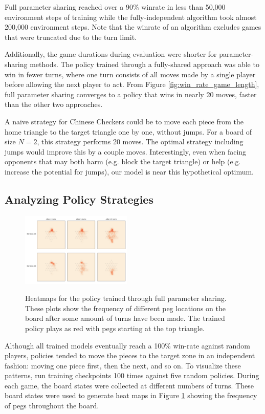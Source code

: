 \documentclass[12pt, a4paper, twocolumn]{article}
\begin{document}
Full parameter sharing reached over a 90\% winrate in less than 50,000 environment steps of training while the fully-independent algorithm took almost 200,000 environment steps. Note that the winrate of an algorithm excludes games that were truncated due to the turn limit.

Additionally, the game durations during evaluation were shorter for parameter-sharing methods. The policy trained through a fully-shared approach was able to win in fewer turns, where one turn consists of all moves made by a single player before allowing the next player to act. From Figure \ref{fig:win_rate_game_length}, full parameter sharing converges to a policy that wins in nearly 20 moves, faster than the other two approaches.

A naive strategy for Chinese Checkers could be to move each piece from the home triangle to the target triangle one by one, without jumps. For a board of size $N = 2$, this strategy performs 20 moves. The optimal strategy including jumps would improve this by a couple moves. Interestingly, even when facing opponents that may both harm (e.g. block the target triangle) or help (e.g. increase the potential for jumps), our model is near this hypothetical optimum.

\subsection{Analyzing Policy Strategies}
\begin{figure}[h]
  \centering
    \includegraphics[width=0.47\textwidth]{images/random_heatmap.png}
  \label{fig:heatmap}
  \caption{Heatmaps for the policy trained through full parameter sharing. These plots show the frequency of different peg locations on the board after some amount of turns have been made. The trained policy plays as red with pegs starting at the top triangle.}
\end{figure}

Although all trained models eventually reach a 100\% win-rate against random players, policies tended to move the pieces to the target zone in an independent fashion: moving one piece first, then the next, and so on. To visualize these patterns, run training checkpoints 100 times against five random policies. During each game, the board states were collected at different numbers of turns. These board states were used to generate heat maps in Figure \ref{fig:heatmap} showing the frequency of pegs throughout the board.
\end{document}
